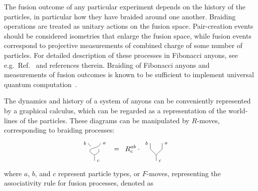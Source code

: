 \documentclass[aps, prl, letterpaper, twocolumn, superscriptaddress, notitlepage, 10pt]{revtex4-1}
\begin{document}
The fusion outcome of any particular experiment depends on the history of the particles, in 
particular how they have braided around one another. Braiding operations are treated as 
unitary actions on the fusion space. Pair-creation events should be considered isometries 
that enlarge the fusion space, while fusion events correspond to projective measurements 
of combined charge of some number of particles. For detailed description of these 
processes in Fibonacci anyons, see e.g.~Ref.~\cite{Nayak2008} and references therein. 
Braiding of Fibonacci anyons and measurements of fusion outcomes is known to be 
sufficient to implement universal quantum computation~\cite{Freedman2002, Nayak2008}.

The dynamics and history of a system of anyons can be conveniently represented by a graphical calculus, which can be regarded as a representation of the world-lines of the particles. These diagrams can be manipulated by $R$-moves, corresponding to braiding processes:
	\begin{align}
	\label{e:rmove}
		\begin{tikzpicture}[baseline=0.5cm,scale=0.3]		
			\draw(0,0)--(0,1);
			\draw plot [smooth, tension=1] coordinates { (0,1) (0.75,1.8) (-0.6,2.45) (-1,3)};
			\draw[color=white, line width=7] plot [smooth, tension=1] coordinates { (0,1) (-0.75,1.8) (0.6,2.45) (1,3)};
			\draw plot [smooth, tension=1] coordinates { (0,1) (-0.75,1.8) (0.6,2.45) (1,3)};
			\node at (0,0) [anchor=west] {{\scriptsize $c$}};
			\node at (-1,3) [anchor=east] {{\scriptsize $b$}};
			\node at (1,3) [anchor=west] {{\scriptsize $a$}};
		\end{tikzpicture}
		&\;\;=\;\;R^{ab}_c\cdot\;
		\begin{tikzpicture}[baseline=0.5cm,scale=0.3]		
			\draw(0,0)--(0,1);
			\draw(0,1)--(-1,2)--(-1,3);
			\draw(0,1)--(1,2)--(1,3);
			\node at (0,0) [anchor=west] {{\scriptsize $c$}};
			\node at (-1,3) [anchor=east] {{\scriptsize $b$}};
			\node at (1,3) [anchor=west] {{\scriptsize $a$}};
		\end{tikzpicture}
	\end{align}
where $a$, $b$, and $c$ represent particle types, or $F$-moves, representing the associativity rule for fusion processes, denoted as
\end{document}
